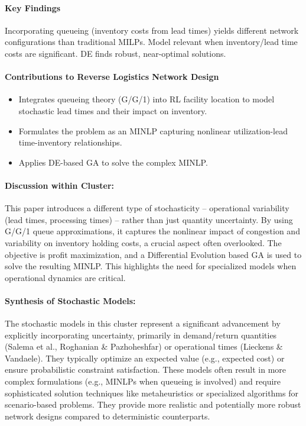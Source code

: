 \paragraph{Key Findings} Incorporating queueing (inventory costs from lead times) yields different network configurations than traditional MILPs. Model relevant when inventory/lead time costs are significant. DE finds robust, near-optimal solutions.
\paragraph{Contributions to Reverse Logistics Network Design}
\begin{itemize}
    \item Integrates queueing theory (G/G/1) into RL facility location to model stochastic lead times and their impact on inventory.
    \item Formulates the problem as an MINLP capturing nonlinear utilization-lead time-inventory relationships.
    \item Applies DE-based GA to solve the complex MINLP.
\end{itemize}
\paragraph{Discussion within Cluster:} This paper introduces a different type of stochasticity – operational variability (lead times, processing times) – rather than just quantity uncertainty. By using G/G/1 queue approximations, it captures the nonlinear impact of congestion and variability on inventory holding costs, a crucial aspect often overlooked. The objective is profit maximization, and a Differential Evolution based GA is used to solve the resulting MINLP. This highlights the need for specialized models when operational dynamics are critical.

\paragraph{Synthesis of Stochastic Models:}
The stochastic models in this cluster represent a significant advancement by explicitly incorporating uncertainty, primarily in demand/return quantities (Salema et al., Roghanian \& Pazhoheshfar) or operational times (Lieckens \& Vandaele). They typically optimize an expected value (e.g., expected cost) or ensure probabilistic constraint satisfaction. These models often result in more complex formulations (e.g., MINLPs when queueing is involved) and require sophisticated solution techniques like metaheuristics or specialized algorithms for scenario-based problems. They provide more realistic and potentially more robust network designs compared to deterministic counterparts.

